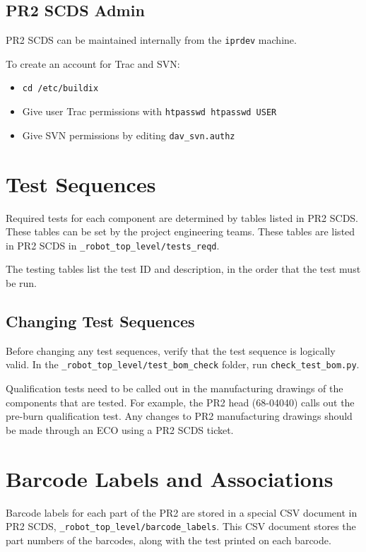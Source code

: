 \documentclass[11pt]{report}
\begin{document}
\subsection{PR2 SCDS Admin}

PR2 SCDS can be maintained internally from the \texttt{iprdev} machine. 

To create an account for Trac and SVN:
\begin{itemize}
\item \texttt{cd /etc/buildix}
\item Give user Trac permissions with \texttt{htpasswd htpasswd USER}
\item Give SVN permissions by editing \texttt{dav\_svn.authz}
\end{itemize}

\section{Test Sequences}

Required tests for each component are determined by tables listed in PR2 SCDS. These tables can be set by the project engineering teams. These tables are listed in PR2 SCDS in \texttt{\_robot\_top\_level/tests\_reqd}. 

The testing tables list the test ID and description, in the order that the test must be run.

\subsection{Changing Test Sequences}

Before changing any test sequences, verify that the test sequence is logically valid. In the \texttt{\_robot\_top\_level/test\_bom\_check} folder, run \texttt{check\_test\_bom.py}. 

Qualification tests need to be called out in the manufacturing drawings of the components that are tested. For example, the PR2 head (68-04040) calls out the pre-burn qualification test. Any changes to PR2 manufacturing drawings should be made through an ECO using a PR2 SCDS ticket.

\section{Barcode Labels and Associations}

Barcode labels for each part of the PR2 are stored in a special CSV document in PR2 SCDS, \texttt{\_robot\_top\_level/barcode\_labels}. This CSV document stores the part numbers of the barcodes, along with the test printed on each barcode. 
\end{document}
